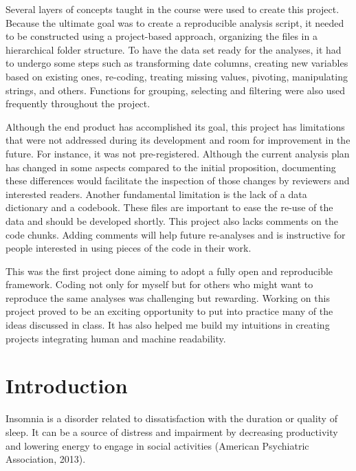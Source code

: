 \documentclass[
  letterpaper,
  DIV=11,
  numbers=noendperiod]{scrreprt}
\begin{document}

Several layers of concepts taught in the course were used to create this
project. Because the ultimate goal was to create a reproducible analysis
script, it needed to be constructed using a project-based approach,
organizing the files in a hierarchical folder structure. To have the
data set ready for the analyses, it had to undergo some steps such as
transforming date columns, creating new variables based on existing
ones, re-coding, treating missing values, pivoting, manipulating
strings, and others. Functions for grouping, selecting and filtering
were also used frequently throughout the project.

Although the end product has accomplished its goal, this project has
limitations that were not addressed during its development and room for
improvement in the future. For instance, it was not pre-registered.
Although the current analysis plan has changed in some aspects compared
to the initial proposition, documenting these differences would
facilitate the inspection of those changes by reviewers and interested
readers. Another fundamental limitation is the lack of a data dictionary
and a codebook. These files are important to ease the re-use of the data
and should be developed shortly. This project also lacks comments on the
code chunks. Adding comments will help future re-analyses and is
instructive for people interested in using pieces of the code in their
work.

This was the first project done aiming to adopt a fully open and
reproducible framework. Coding not only for myself but for others who
might want to reproduce the same analyses was challenging but rewarding.
Working on this project proved to be an exciting opportunity to put into
practice many of the ideas discussed in class. It has also helped me
build my intuitions in creating projects integrating human and machine
readability.


\hypertarget{introduction}{%
\chapter{Introduction}\label{introduction}}

Insomnia is a disorder related to dissatisfaction with the duration or
quality of sleep. It can be a source of distress and impairment by
decreasing productivity and lowering energy to engage in social
activities (American Psychiatric Association, 2013).
\end{document}
